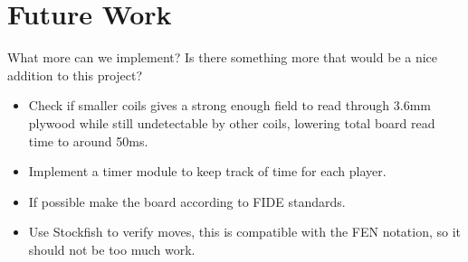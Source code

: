 \chapter{Future Work}
What more can we implement? Is there something more that would be a nice addition to this project?

\begin{itemize}
    \item Check if smaller coils gives a strong enough field to read through 3.6mm plywood while still undetectable by other coils, lowering total board read time to around 50ms.
    \item Implement a timer module to keep track of time for each player.
    \item If possible make the board according to FIDE standards.
    \item Use Stockfish to verify moves, this is compatible with the FEN notation, so it should not be too much work.
\end{itemize}